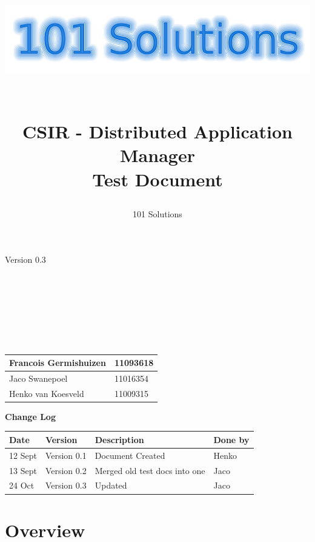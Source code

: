 \documentclass[a4paper,12pt,final]{article}
\title{
\begin{center}
  	\includegraphics[scale=0.3]{101Logo.png} 
  \end{center}
  \textbf{\\}
CSIR - Distributed Application Manager\\
Test Document\\
}
\author{101 Solutions}
\begin{document}
\maketitle
\begin{center}
Version 0.3
\end{center}
\textbf{\\}
\textbf{\\}
\textbf{\\}
\textbf{\\}
\textbf{\\}
\textbf{\\}
\begin{center}
\begin{tabular}{|l|l|}
\hline
Francois Germishuizen & 11093618\\
\hline
Jaco Swanepoel & 11016354\\
\hline
Henko van Koesveld & 11009315\\
\hline
\end{tabular}
\end{center}
\thispagestyle{empty}
\newpage
\thispagestyle{empty}
\textbf{\large{Change Log}}
\vspace{6pt}\newline
\begin{tabular}{|l|l|l|l|}
\hline
\textbf{Date} & \textbf{Version} & \textbf{Description} & \textbf{Done by}\\
\hline
12 Sept & Version 0.1 & Document Created&Henko\\
\hline
13 Sept & Version 0.2 & Merged old test docs into one&Jaco\\
\hline
24 Oct & Version 0.3 & Updated&Jaco\\
\hline
\end{tabular}
\newpage
\tableofcontents
\thispagestyle{empty}
\newpage

\section{Overview}
\end{document}

